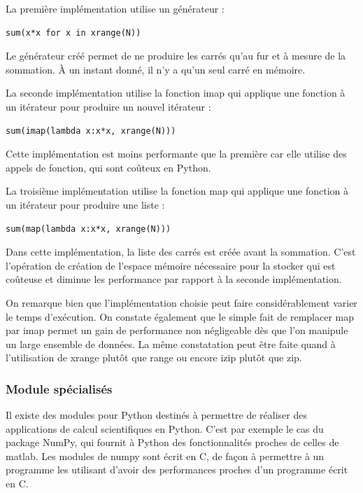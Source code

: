 \documentclass[a4paper]{article}
\begin{document}
La première implémentation utilise un générateur :

\begin{lstlisting}
sum(x*x for x in xrange(N))
\end{lstlisting}

Le générateur créé permet de ne produire les carrés qu'au fur et à
mesure de la sommation. À un instant donné, il n'y a qu'un seul carré
en mémoire.


La seconde implémentation utilise la fonction imap qui applique une
fonction à un itérateur pour produire un nouvel itérateur :

\begin{verbatim}
sum(imap(lambda x:x*x, xrange(N)))
\end{verbatim}

Cette implémentation est moins performante que la première car elle
utilise des appels de fonction, qui sont coûteux en Python.


La troisième implémentation utilise la fonction map qui applique une
fonction à un itérateur pour produire une liste :

\begin{verbatim}
sum(map(lambda x:x*x, xrange(N)))
\end{verbatim}

Dans cette implémentation, la liste des carrés est créée avant la
sommation. C'est l'opération de création de l'espace mémoire
nécessaire pour la stocker qui est coûteuse et diminue les performance
par rapport à la seconde implémentation.

On remarque bien que l'implémentation choisie peut faire
considérablement varier le temps d'exécution. On constate également
que le simple fait de remplacer map par imap permet un gain de
performance non négligeable dès que l'on manipule un large ensemble de
données. La même constatation peut être faite quand à l'utilisation de
xrange plutôt que range ou encore izip plutôt que zip.

\subsubsection{Module spécialisés}

Il existe des modules pour Python destinés à permettre de réaliser des
applications de calcul scientifiques en Python.  C'est par exemple le
cas du package NumPy, qui fournit à Python des fonctionnalités proches
de celles de matlab. Les modules de numpy sont écrit en C, de façon à
permettre à un programme les utilisant d'avoir des performances
proches d'un programme écrit en C\cite{NumPyPerf}.
\end{document}
